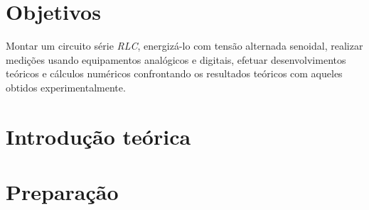 \documentclass[a4paper,12pt,oneside,openany,table,xcdraw]{article}
\begin{document}
\newcommand{\thedepartment}{Faculdade de Engenharia Elétrica}
\newcommand{\thecourse}{FEELT}
\newcommand{\thetitle}{TENSÕES, CORRENTE E POTÊNCIAS EM CIRCUITO SÉRIE, FATOR DE POTÊNCIA E CORRENTE ALTERNADA SENOIDAL - USO DE MEDIDORES ANALÓGICOS E DIGITAIS}
\newcommand{\thetype}{Relatório da Disciplina de Circuitos Elétricos II}
\newcommand{\theproftitle}{Bacharel em Engenharia Elétrica}
\newcommand{\thestudent}{Lesly Viviane Montúfar Berrios\\
\centering11811ETE001}
\newcommand{\theadvisor}{Prof. Wellington Maycon Santos Bernardes}
\newcommand{\thecity}{Uberlândia}

\thispagestyle{empty}


\onehalfspacing
\tableofcontents %
\newpage

\section{Objetivos} %
Montar um circuito série \emph{RLC}, energizá-lo com tensão alternada senoidal, realizar medições usando
equipamentos analógicos e digitais, efetuar desenvolvimentos teóricos e cálculos numéricos confrontando os
resultados teóricos com aqueles obtidos experimentalmente.

\section{Introdução teórica} %



\section{Preparação}
\end{document}

